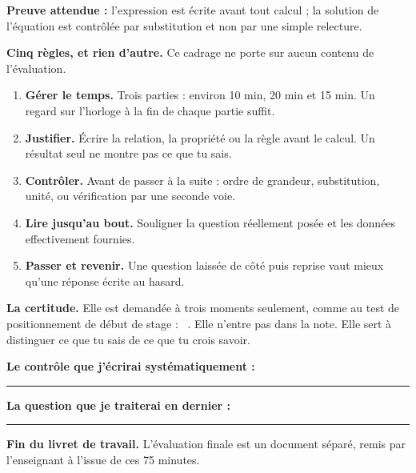 \documentclass[10pt,a4paper]{article}
\begin{document}
\begin{successbox}
\textbf{Preuve attendue :} l'expression est écrite avant tout calcul ; la solution de l'équation est
contrôlée par substitution et non par une simple relecture.
\end{successbox}

\needspace{62mm}\par\vspace{3mm}

\begin{methodbox}
\textbf{Cinq règles, et rien d'autre.} Ce cadrage ne porte sur aucun contenu de l'évaluation.
\begin{enumerate}
\item \textbf{Gérer le temps.} Trois parties : environ 10 min, 20 min et 15 min. Un regard sur l'horloge à la fin de chaque partie suffit.
\item \textbf{Justifier.} Écrire la relation, la propriété ou la règle avant le calcul. Un résultat seul ne montre pas ce que tu sais.
\item \textbf{Contrôler.} Avant de passer à la suite : ordre de grandeur, substitution, unité, ou vérification par une seconde voie.
\item \textbf{Lire jusqu'au bout.} Souligner la question réellement posée et les données effectivement fournies.
\item \textbf{Passer et revenir.} Une question laissée de côté puis reprise vaut mieux qu'une réponse écrite au hasard.
\end{enumerate}
\end{methodbox}

\begin{graybox}
\textbf{La certitude.} Elle est demandée à trois moments seulement, comme au test de positionnement de début de stage :
\conf\ . Elle n'entre pas dans la note. Elle sert à distinguer ce que tu sais de ce que tu crois savoir.
\end{graybox}

\par\vspace{1mm}
\noindent\textbf{Le contrôle que j'écrirai systématiquement :}\ \rule{\dimexpr\linewidth-76mm\relax}{0.32pt}
\par\vspace{3mm}
\noindent\textbf{La question que je traiterai en dernier :}\ \rule{\dimexpr\linewidth-68mm\relax}{0.32pt}
\par\vspace{1mm}

\begin{warningbox}\textbf{Fin du livret de travail.} L'évaluation finale est un document séparé, remis par l'enseignant à l'issue de ces 75 minutes.\end{warningbox}
\end{document}
